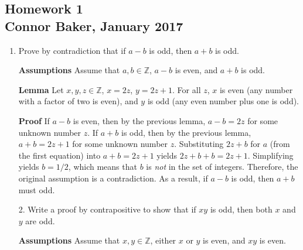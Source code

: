 \documentclass[12pt]{article}
\begin{document}
\begin{center}
\subsection*{Homework 1\\Connor Baker, January 2017}
\end{center}

\begin{enumerate}
\item Prove by contradiction that if $a-b$ is odd, then $a+b$ is odd.
\end{enumerate}

\begin{enumerate}
  \item[\textbf{Assumptions}] Assume that $a,b \in\mathbb{Z}$, $a-b$ is even, and $a+b$ is odd.
\end{enumerate}

\begin{enumerate}
  \item[\textbf{Lemma}] Let $x,y,z \in\mathbb{Z}$, $x=2z$, $y=2z+1$. For all $z$, $x$ is even (any number with a factor of two is even), and $y$ is odd (any even number plus one is odd).
\end{enumerate}

\begin{enumerate}
  \item[\textbf{Proof}] If $a-b$ is even, then by the previous lemma, $a-b=2z$ for some unknown number $z$. If $a+b$ is odd, then by the previous lemma, $a+b=2z+1$ for some unknown number $z$. Substituting $2z+b$ for $a$ (from the first equation) into $a+b=2z+1$ yields $2z+b+b=2z+1$. Simplifying yields $b=1/2$, which means that $b$ is \textit{not} in the set of integers. Therefore, the original assumption is a contradiction. As a result, if $a-b$ is odd, then $a+b$ must odd.
\end{enumerate}

\begin{enumerate}
\item[2.] Write a proof by contrapositive to show that if $xy$ is odd, then both $x$ and $y$ are odd.
\end{enumerate}

\begin{enumerate}
  \item[\textbf{Assumptions}] Assume that $x,y \in\mathbb{Z}$, either $x$ or $y$ is even, and $xy$ is even.
\end{enumerate}
\end{document}
